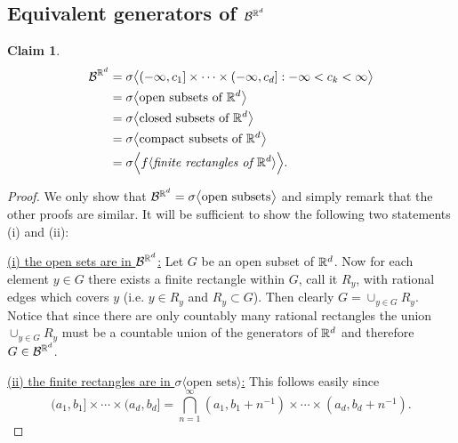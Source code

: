 \documentclass[10pt,letterpaper,twocolumn]{article}
\newtheorem{claim}{Claim}
\begin{document}
\subsection{Equivalent generators of $\mathcal B^{\Bbb R^d}$}
\label{equiv}

\begin{claim}
\begin{align}
\mathcal B^{\Bbb R^d}
& = \sigma\bigl\langle (-\infty,c_1]\times \cdots \times (-\infty, c_d]: -\infty < c_k< \infty \bigr\rangle \label{rrr}   \\
& = \sigma\bigl\langle \text{open subsets of $\Bbb R^d$}  \bigr\rangle  \\
& = \sigma\bigl\langle \text{closed subsets of $\Bbb R^d$}  \bigr\rangle\\
& = \sigma\bigl\langle \text{compact subsets of $\Bbb R^d$}  \bigr\rangle\\
&= \sigma \Bigl\langle f\langle \textit{finite rectangles of $\Bbb R^d$} \rangle\Bigr\rangle.
\end{align}
\end{claim}
\begin{proof}
 We only show that $\mathcal B^{\Bbb R^d} =  \sigma\bigl\langle \text{open subsets}\bigr\rangle$ and simply remark that the other proofs are similar. It will be sufficient to show the following two statements (i) and (ii):

 \vspace{.2cm}
\noindent
\underline{(i) the open sets are in $\mathcal B^{\Bbb R^d}$:}
Let $G$ be an open subset of $\Bbb R^d$. Now for each element $y\in G$ there exists a finite rectangle within $G$, call it $R_y$, with rational edges which covers $y$ (i.e. $y\in R_y$ and $R_y\subset G$). Then clearly $G= \cup_{y\in G} R_y$. Notice that since there are only countably many rational rectangles the union $ \cup_{y\in G} R_y$ must be a countable union of the generators of $\Bbb R^d$ and therefore $G\in \mathcal B^{\Bbb R^d}$.

\vspace{.2cm}
\noindent
\underline{(ii) the finite rectangles are in $\sigma\bigl\langle \text{open sets}  \bigr\rangle$:}
 This follows easily since
\[ (a_1,b_1]\times \cdots \times (a_d,b_d] = \bigcap_{n=1}^\infty  (a_1,b_1+n^{-1})\times \cdots \times (a_d,b_d+n^{-1}). \]
\end{proof}
\end{document}
